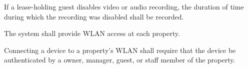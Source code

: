 \documentclass[letter,titlepage,oneside,english]{report}
\begin{document}
\begin{fr}
\begin{fr}
\begin{fr}
    \item
      If a lease-holding guest disables video or audio recording, the duration of time during which the recording was disabled shall be recorded.
    \end{fr}
  \end{fr}
\item
  The system shall provide WLAN access at each property.
  \begin{fr}
  \item
    Connecting a device to a property's WLAN shall require that the device be authenticated by a owner, manager, guest, or staff member of the property.
  \end{fr}
\end{fr}
\end{document}
